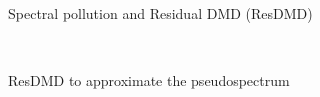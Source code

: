 \documentclass{beamer}
\begin{document}
\begin{frame}{Spectral pollution and Residual DMD (ResDMD)}
\begin{figure}[h]
{\begin{subfigure}{.49\linewidth}
  \end{subfigure}}\\
\end{figure}
\end{frame}

\begin{frame}{ResDMD to approximate the pseudospectrum}
\end{frame}
\end{document}
